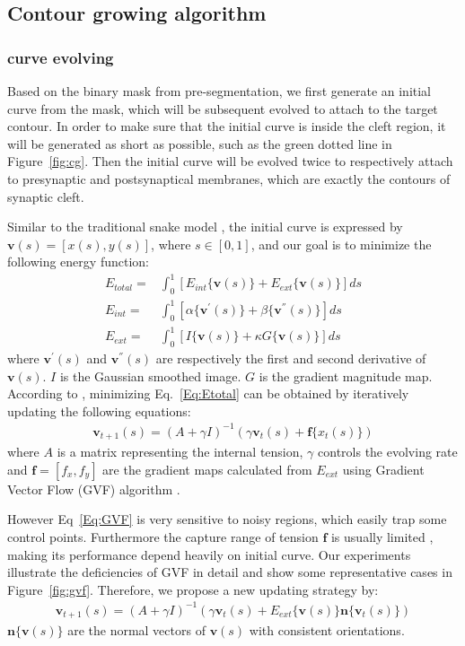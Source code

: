 \subsection{Contour growing algorithm}
\subsubsection{curve evolving}
\label{sec:curve_evolving}
Based on the binary mask from pre-segmentation, we first generate an initial curve from the mask, which will be subsequent evolved to attach to the target contour.
In order to make sure that the initial curve is inside the cleft region, it will be generated as short as possible, such as the green dotted line in Figure~\ref{fig:cg}.
Then the initial curve will be evolved twice to respectively attach to presynaptic and postsynaptical membranes, which are exactly the contours of synaptic cleft.

Similar to the traditional snake model \cite{Kass1988}, the initial curve is expressed by $\mathbf{v}(s)=[x(s),y(s)]$, where $s\in[0,1]$, and our goal is to minimize the following energy function:
\begin{eqnarray}\label{Eq:Etotal}
E_{total} =& \int_{0}^{1}[E_{int}\{\mathbf{v}(s)\}+E_{ext}\{\mathbf{v}(s)\}]ds\nonumber \\
E_{int} =& \int_{0}^{1}[\alpha\{\mathbf{v}^{'}(s)\}+\beta\{\mathbf{v}^{''}(s)\}]ds \\
E_{ext} =& \int_{0}^{1}[I\{\mathbf{v}(s)\} + \kappa G\{\mathbf{v}(s)\}]ds\nonumber
\end{eqnarray}
where $\mathbf{v}^{'}(s)$ and $\mathbf{v}^{''}(s)$ are respectively the first and second derivative of $\mathbf{v}(s)$.
$I$ is the Gaussian smoothed image.
$G$ is the gradient magnitude map.
According to \cite{Kass1988}, minimizing Eq.~\ref{Eq:Etotal} can be obtained by iteratively updating the following equations:
\begin{eqnarray}\label{Eq:GVF}
\mathbf{v}_{t+1}(s) = (A+\gamma I)^{-1}(\gamma \mathbf{v}_t(s)+\mathbf{f}\{x_t(s)\})
\end{eqnarray}
where $A$ is a matrix representing the internal tension, $\gamma$ controls the evolving rate and $\mathbf{f}=[f_{x},f_{y}]$ are the gradient maps calculated from $E_{ext}$ using Gradient Vector Flow (GVF) algorithm \cite{Xu1998}.

However Eq~\ref{Eq:GVF} is very sensitive to noisy regions, which easily trap some control points.
Furthermore the capture range of tension $\mathbf{f}$ is usually limited \cite{Cohen1991}, making its performance depend heavily on initial curve.
Our experiments illustrate the deficiencies of GVF in detail and show some representative cases in Figure~\ref{fig:gvf}.
Therefore, we propose a new updating strategy by:
\begin{eqnarray}\label{Eq:update}
\mathbf{v}_{t+1}(s) = (A+\gamma I)^{-1}(\gamma \mathbf{v}_t(s)+E_{ext}\{\mathbf{v}(s)\}\mathbf{n}\{\mathbf{v}_t(s)\})
\end{eqnarray}
$\mathbf{n}\{\mathbf{v}(s)\}$ are the normal vectors of $\mathbf{v}(s)$ with consistent orientations.

